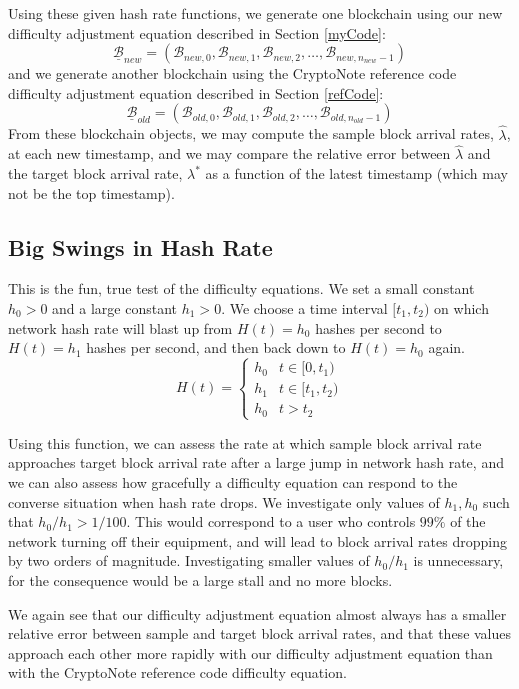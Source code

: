 \documentclass[12pt,english]{mrl}
\theoremstyle{definition}
\numberwithin{equation}{section}
\numberwithin{figure}{section}
\numberwithin{equation}{section}
\numberwithin{equation}{section}
\numberwithin{figure}{section}
\begin{document}
Using these given hash rate functions, we generate one blockchain using our new difficulty adjustment equation described in Section \ref{myCode}:
\[\underline{\mathcal{B}}_{new} = (\mathcal{B}_{new,0}, \mathcal{B}_{new,1}, \mathcal{B}_{new,2}, \ldots, \mathcal{B}_{new,n_{new}-1})\]
and we generate another blockchain using the CryptoNote reference code difficulty adjustment equation described in Section \ref{refCode}:
\[\underline{\mathcal{B}}_{old} = (\mathcal{B}_{old,0}, \mathcal{B}_{old,1}, \mathcal{B}_{old,2}, \ldots, \mathcal{B}_{old,n_{old}-1})\]
From these blockchain objects, we may compute the sample block arrival rates, $\hat{\lambda}$, at each new timestamp, and we may compare the relative error between $\hat{\lambda}$ and the target block arrival rate, $\lambda^{*}$ as a function of the latest timestamp (which may not be the top timestamp).

\subsection{Big Swings in Hash Rate}\label{topHatComp}

This is the fun, true test of the difficulty equations. We set a small constant $h_0 > 0$ and a large constant $h_1 > 0$. We choose a time interval $[t_1, t_2)$ on which network hash rate will blast up from $H(t) = h_0$ hashes per second to $H(t) = h_1$ hashes per second, and then back down to $H(t) = h_0$ again.
\[H(t) = \begin{cases} h_0 & t \in [0,t_1)\\
h_1 & t \in [t_1, t_2)\\
h_0 & t > t_2\end{cases}\]

Using this function, we can assess the rate at which sample block arrival rate approaches target block arrival rate after a large jump in network hash rate, and we can also assess how gracefully a difficulty equation can respond to the converse situation when hash rate drops. We investigate only values of $h_1, h_0$ such that $h_0/h_1 > 1/100$. This would correspond to a user who controls $99\%$ of the network turning off their equipment, and will lead to block arrival rates dropping by two orders of magnitude. Investigating smaller values of $h_0/h_1$ is unnecessary, for the consequence would be a large stall and no more blocks.

We again see that our difficulty adjustment equation almost always has a smaller relative error between sample and target block arrival rates, and that these values approach each other more rapidly with our difficulty adjustment equation than with the CryptoNote reference code difficulty equation. 
\end{document}
